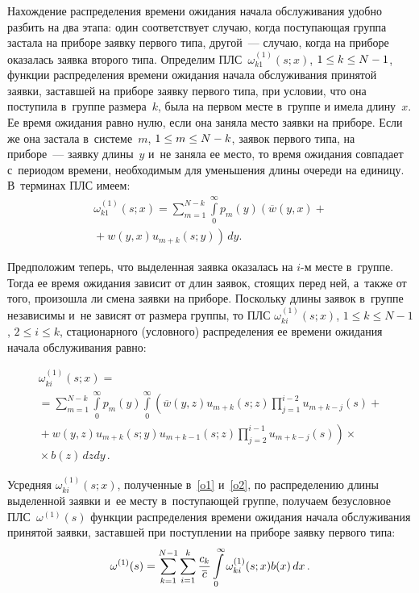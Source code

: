 \begin{multicols}{2}
Нахождение распределения времени ожидания начала обслуживания удобно разбить
на два этапа: один соответствует случаю, когда поступа\-ющая группа застала
на приборе заявку первого типа, другой~--- случаю, когда на приборе оказалась
заявка второго типа.
Определим ПЛС~$\omega^{(1)}_{k1}(s;x)$, $1 \hm\le k\hm \le N\hm-1$, 
функции распределения
времени ожидания начала обслуживания принятой заявки,
заставшей на приборе заявку первого типа, при условии,
что она поступила в~группе размера~$k$, была на первом месте в~группе
и имела длину~$x$. Ее время ожидания равно нулю, если она
 заняла место заявки на приборе.
Если же она застала в~сис\-те\-ме~$m$, $1 \hm\le m \hm\le N\hm-k$, 
заявок первого типа,
на приборе~--- заявку длины~$y$ и~не заняла ее место,
то время ожидания совпадает с~периодом времени, необходимым для
уменьшения длины очереди на единицу. В~терминах ПЛС имеем:
\begin{multline}
\label{o1} 
\omega^{(1)}_{k1}(s;x)
= \sum\limits_{m=1}^{N-k} \int\limits_0^\infty \!p_m(y)
\left ( \overline{w}(y,x) +{}\right.\\
\left.{}+ w(y,x) u_{m+k}(s;y)
\right )\,dy.
\end{multline}

\noindent Предположим теперь, что выделенная заявка оказалась на $i$-м месте
в~группе. Тогда ее время ожидания зависит от длин заявок, стоящих перед ней, 
а~также от того, произошла ли смена заявки на приборе. 
Поскольку длины заявок в~группе независимы и~не зависят от размера группы, 
то ПЛС $\omega^{(1)}_{ki}(s;x)$, $1 \le k \le N-1$, $2 \le i \le k$,
стационарного (условного) распределения ее времени ожидания начала 
обслуживания равно:

\noindent
\begin{multline}
\label{o2}
\omega^{(1)}_{ki}(s;x)
= {}\\
{}=\!\sum\limits_{m=1}^{N-k}
\int\limits_0^\infty p_m(y)\!
\int\limits_0^\infty\!\!
\left (\! \overline{w}(y,z) u_{m+k}(s;z) 
\prod\limits_{j=1}^{i-2} \!u_{m+k-j}(s) \right.
+{}
\\
\left.
{}+
w(y,z) u_{m+k}(s;y) u_{m+k-1}(s;z) \prod\limits_{j=2}^{i-1}
u_{m+k-j}(s) \right )\times{}\\
{}\times b(z)\,dzdy\,.
\end{multline}

\noindent Усредняя $\omega^{(1)}_{ki}(s;x)$, полученные 
в~\eqref{o1} и~\eqref{o2},
по распределению длины выделенной заявки и~ее мес\-ту в~поступающей группе,
получаем безусловное ПЛС~$\omega^{(1)}(s)$ функции распределения времени
ожидания начала обслуживания принятой заявки, заставшей при поступлении
на приборе заявку первого типа:
\begin{equation}
\label{w3}
\omega^{(1)}(s)
=\sum\limits_{k=1}^{N-1} \sum\limits_{i=1}^k
\displaystyle\frac{\displaystyle c_k\mathstrut}{\displaystyle \overline{c}\mathstrut} \int\limits_0^\infty
\omega^{(1)}_{ki}(s;x) b(x)\,dx\,.
\end{equation}



\end{multicols}
